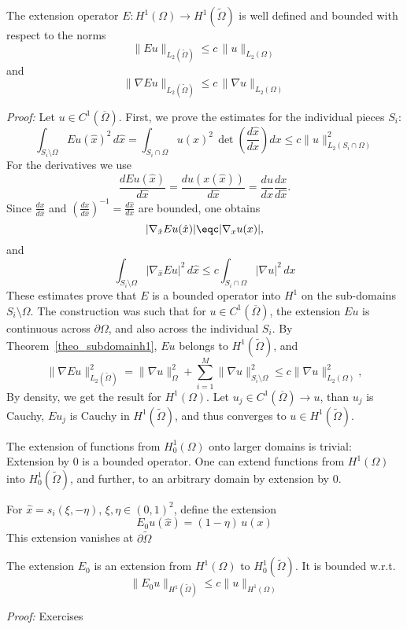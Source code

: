 \begin{theorem} The extension operator $E : H^1(\Omega) \rightarrow H^1(\widetilde \Omega)$ is well defined and bounded with respect to the norms
$$
\| E u \|_{L_2(\widetilde \Omega)} \leq c \, \| u \|_{L_2(\Omega)}
$$
and
$$
\| \nabla E u \|_{L_2(\widetilde \Omega)} \leq c \, \| \nabla u \|_{L_2(\Omega)}
$$
\end{theorem}
{\em Proof:} Let $u \in C^1(\overline \Omega)$. First, we prove the estimates
for the individual pieces $S_i$:
$$
\int_{S_i \setminus \Omega} E u (\hat x)^2 \, d \hat x =
\int_{S_i \cap \Omega} u (x)^2 \, \det \left( \frac{d \hat x}{d x} \right) d x \leq
c \| u \|_{L_2(S_i \cap \Omega)}^2 
$$
For the derivatives we use
$$
\frac{d E u(\hat x)}{d\hat x} = \frac{d u(x(\hat x))}{d \hat x} =
        \frac{d u}{dx} \frac{dx}{d \hat x}.
$$
Since $\frac{d x}{d \hat x}$ and $(\frac{d x}{d \hat x})^{-1} = \frac{d \hat x}{dx}$ are bounded, one obtains
$$
| \nabla_{\hat x} E u (\hat x) | \eqc | \nabla_x u(x) |,
$$
and 
$$
\int_{S_i \setminus \Omega} | \nabla_{\hat x} E u |^2 \, d \hat x \leq 
        c \int_{S_i \cap \Omega} | \nabla u |^2 \, dx
$$
These estimates prove that $E$ is a bounded operator into $H^1$ on the
sub-domains $S_i \setminus \Omega$. The construction 
was such that for $u \in C^1(\overline \Omega)$, the extension $E u$ is 
continuous across $\partial \Omega$, and also across the individual $S_i$.
By Theorem~\ref{theo_subdomainh1}, $E u $ belongs
to $H^1 (\widetilde \Omega)$, and
$$
\| \nabla E u \|_{L_2(\widetilde \Omega)}^2 = 
\| \nabla u \|_{\Omega}^2 + \sum_{i=1}^M \| \nabla u \|_{S_i \setminus \Omega}^2 \leq c \| \nabla u \|_{L_2(\Omega)}^2,
$$
By density, we get the result for $H^1(\Omega)$. Let $u_j  \in C^1(\overline \Omega) \rightarrow  u$, than $u_j$ is Cauchy, $E u_j$ is Cauchy in $H^1(\widetilde \Omega)$, and thus converges to $u \in H^1(\widetilde \Omega)$.

\bigskip

The extension of functions from $H_0^1(\Omega)$ onto larger domains is
trivial: Extension by $0$ is a bounded operator.
One can extend functions from $H^1(\Omega)$ into $H_0^1(\widetilde \Omega)$,
and further, to an arbitrary domain by extension by $0$.

For $\hat x = s_i(\xi, -\eta)$, $\xi, \eta \in (0,1)^2$, define the extension
$$
E_0 u (\hat x) = (1-\eta) \, u(x) 
$$
This extension vanishes at $\partial \widetilde \Omega$

\begin{theorem}
The extension $E_0$ is an extension from $H^1(\Omega)$ to $H_0^1(\widetilde \Omega)$. It is bounded w.r.t. 
$$
\| E_0 u \|_{H^1(\widetilde \Omega)} \leq c \| u \|_{H^1(\Omega)}
$$
\end{theorem}
\noindent
{\em Proof:} Exercises

